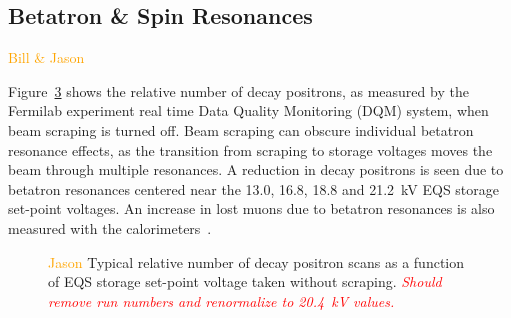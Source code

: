 \subsection{\label{sec:reson} Betatron \& Spin Resonances}
\textcolor{orange}{Bill \& Jason}
\medskip

Figure~\ref{fig:storage_scan} shows the relative number of decay positrons, as measured by the Fermilab experiment real time Data Quality Monitoring (DQM) system, when beam scraping is turned off. Beam scraping can obscure individual betatron resonance effects, as the transition from scraping to storage voltages moves the beam through multiple resonances. A reduction in decay positrons is seen due to betatron resonances centered near the 13.0, 16.8, 18.8 and \SI{21.2}{\kilo\volt} EQS storage set-point voltages. An increase in lost muons due to betatron resonances is also measured with the calorimeters~\cite{Ganguly:IPAC2018-THPAK139}.

\begin{figure}[]
	\centering
	\begin{subfigure}{\columnwidth}
		\caption{}\label{fig:storage_scan_180210}
	\end{subfigure}
	\begin{subfigure}{\columnwidth}
		\caption{}\label{fig:storage_scan_180324}
	\end{subfigure}
	\caption{\textcolor{orange}{Jason} Typical relative number of decay positron scans as a function of EQS storage set-point voltage taken without scraping. \textcolor{red}{\textit{Should remove run numbers and renormalize to \SI{20.4}{\kilo\volt} values.}}}\label{fig:storage_scan}
\end{figure}

